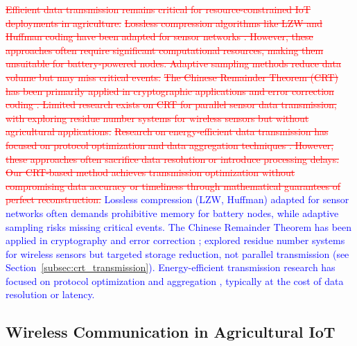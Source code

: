 \documentclass[pdflatex,sn-mathphys-num]{sn-jnl}
\theoremstyle{thmstyleone}
\theoremstyle{thmstyletwo}
\theoremstyle{thmstylethree}
\begin{document}
{\textcolor{red}{\sout{Efficient data transmission remains critical for resource-constrained IoT deployments in agriculture.}}
\textcolor{red}{\sout{Lossless compression algorithms like LZW and Huffman coding have been adapted for sensor networks . However, these approaches often require significant computational resources, making them unsuitable for battery-powered nodes. Adaptive sampling methods reduce data volume but may miss critical events.}}
\textcolor{red}{\sout{The Chinese Remainder Theorem (CRT) has been primarily applied in cryptographic applications and error correction coding . Limited research exists on CRT for parallel sensor data transmission, with exploring residue number systems for wireless sensors but without agricultural applications.}}
\textcolor{red}{\sout{Research on energy-efficient data transmission has focused on protocol optimization and data aggregation techniques . However, these approaches often sacrifice data resolution or introduce processing delays. Our CRT-based method achieves transmission optimization without compromising data accuracy or timeliness through mathematical guarantees of perfect reconstruction.}}
\textcolor{blue}{Lossless compression (LZW, Huffman) adapted for sensor networks \cite{li2018lossless, marcelloni2009energy} often demands prohibitive memory for battery nodes, while adaptive sampling \cite{kjellsson2008adaptive} risks missing critical events. The Chinese Remainder Theorem has been applied in cryptography \cite{ding1996remainder, garner1959residue} and error correction \cite{goldreich1999china}; \cite{wang2018novel} explored residue number systems for wireless sensors but targeted storage reduction, not parallel transmission (see Section~\ref{subsec:crt_transmission}). Energy-efficient transmission research has focused on protocol optimization \cite{sanchez2021energy} and aggregation \cite{heinzelman2000energy}, typically at the cost of data resolution or latency.}

\subsection{Wireless Communication in Agricultural IoT}
\label{subsec:wireless_communication}

}
\end{document}
